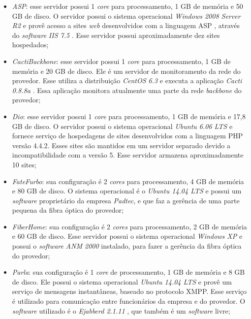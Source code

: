 \begin{itemize}
 \item \textit{ASP}: esse servidor possui 1 \textit{core} para processamento, 1 GB de memória e 50 GB de disco. O servidor possui o sistema 
 operacional \textit{Windows 2008 Server R2} e provê acesso a sites \textit{web} desenvolvidos com a linguagem \ac{ASP} \cite{asp}, através do
 \textit{software} \textit{\ac{IIS} 7.5} \cite{iis}. Esse servidor possui aproximadamente dez sites hospedados;
 
 \item \textit{CactiBackbone}: esse servidor possui 1 \textit{core} para processamento, 1 GB de memória e 20 GB de disco. Ele é um servidor
 de monitoramento da rede do provedor. Esse utiliza a distribuição \textit{CentOS 6.3} \cite{centos} e executa a aplicação \textit{Cacti 0.8.8a}
 \cite{cacti}. Essa aplicação monitora atualmente uma parte da rede \textit{backbone} do provedor;
 
 \item \textit{Dio}: esse servidor possui 1 \textit{core} para processamento, 1 GB de memória e 17,8 GB de disco. O servidor possui o sistema 
 operacional \textit{Ubuntu 6.06 \ac{LTS}} \cite{ubuntu} e fornece serviço de hospedagens de sites desenvolvidos com a linguagem \ac{PHP} 
 versão 4.4.2. Esses sites são mantidos em um servidor separado devido a incompatibilidade com a versão 5. Esse servidor armazena 
 aproximadamente 10 sites;
 
 \item \textit{FateFurbo}: sua configuração é 2 \textit{cores} para processamento, 4 GB de memória e 80 GB de disco. O sistema operacional é o 
 \textit{Ubuntu 14.04 \ac{LTS}} \cite{ubuntu} e possui um \textit{software} proprietário da empresa \textit{Padtec}, e que faz a gerência de uma 
 parte pequena da fibra óptica do provedor;
 
 \item \textit{FiberHome}: sua configuração é 2 \textit{cores} para processamento, 2 GB de memória e 60 GB de disco. Esse servidor possui o sistema 
 operacional \textit{Windows XP} e possui o \textit{software} \textit{ANM 2000} instalado, para fazer a gerência da fibra óptica do provedor;
 
 \item \textit{Parla}: sua configuração é 1 \textit{core} de processamento, 1 GB de memória e 8 GB de disco. Ele possui o sistema
 operacional \textit{Ubuntu 14.04 \ac{LTS}} \cite{ubuntu} e provê um serviço de mensagens instantâneas, baseado no protocolo \ac{XMPP}. Esse 
 serviço é utilizado para comunicação entre funcionários da empresa e do provedor. O \textit{software} utilizado é o \textit{Ejabberd 2.1.11}
 \cite{ejabberd}, que também é um \textit{software} livre;


\end{itemize}
